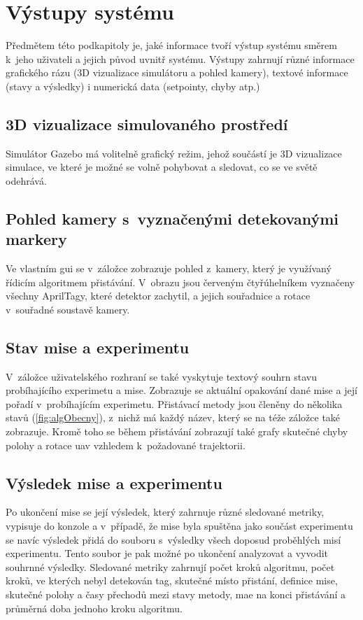   \section{Výstupy systému} \label{sec:outputs}
  Předmětem této podkapitoly je, jaké informace tvoří výstup systému směrem k~jeho uživateli a jejich původ uvnitř systému. Výstupy zahrnují různé informace grafického rázu (3D vizualizace simulátoru a pohled kamery), textové informace (stavy a výsledky) i numerická data (setpointy, chyby atp.)
    \subsection{3D vizualizace simulovaného prostředí}
      Simulátor Gazebo má volitelně grafický režim, jehož součástí je 3D vizualizace simulace, ve které je možné se volně pohybovat a sledovat, co se ve světě odehrává.
    \subsection{Pohled kamery s~vyznačenými detekovanými markery}
      Ve vlastním \acrshort{gui} se v~záložce  zobrazuje pohled z~kamery, který je využívaný řídicím algoritmem přistávání. V~obrazu jsou červeným čtyřúhelníkem vyznačeny všechny AprilTagy, které detektor zachytil, a jejich souřadnice a rotace v~souřadné soustavě kamery.
    \subsection{Stav mise a experimentu}
      V~záložce  uživatelského rozhraní se také vyskytuje textový souhrn stavu probíhajícího experimetu a mise. Zobrazuje se aktuální opakování dané mise a její pořadí v~probíhajícím experimetu. Přistávací metody jsou členěny do několika stavů (\cref{fig:algObecny}), z~nichž má každý název, který se na téže záložce také zobrazuje. Kromě toho se během přistávání zobrazují také grafy skutečné chyby polohy a rotace \acrshort{uav} vzhledem k~požadované trajektorii.
    \subsection{Výsledek mise a experimentu}
      Po ukončení mise se její výsledek, který zahrnuje různé sledované metriky,
      vypisuje do konzole a v~případě, že mise byla spuštěna jako součást experimentu se navíc výsledek přidá do souboru s~výsledky všech doposud proběhlých misí experimentu. Tento soubor je pak možné po ukončení analyzovat a vyvodit souhrnné výsledky. Sledované metriky zahrnují počet kroků algoritmu, počet kroků, ve kterých nebyl detekován tag, skutečné místo přistání, definice mise, skutečné polohy a časy přechodů mezi stavy metody, \acrshort{mae} na konci přistávání a průměrná doba jednoho kroku algoritmu.
